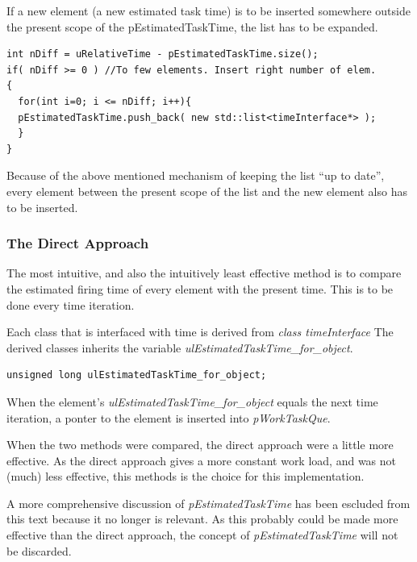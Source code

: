 
	If a new element (a new estimated task time) is to be inserted somewhere outside the present scope of the pEstimatedTaskTime, the list has to be expanded. %
\begin{lstlisting}
int nDiff = uRelativeTime - pEstimatedTaskTime.size();
if( nDiff >= 0 ) //To few elements. Insert right number of elem.
{
  for(int i=0; i <= nDiff; i++){
  pEstimatedTaskTime.push_back( new std::list<timeInterface*> );
  }
}
\end{lstlisting}
	Because of the above mentioned mechanism of keeping the list ``up to date'', every element between the present scope of the list and the new element also has to be inserted.

	

	\subsubsection{The Direct Approach}
	\label{ssChoiceOfTimeEstimationForThisImplementation}
	The most intuitive, and also the intuitively least effective method is to compare the estimated firing time of every element with the present time.
	This is to be done every time iteration.

	Each class that is interfaced with time is derived from \emph{class timeInterface}
	The derived classes inherits the variable \emph{ulEstimatedTaskTime\_for\_object}.
\begin{lstlisting}
unsigned long ulEstimatedTaskTime_for_object;
\end{lstlisting}
	When the element's \emph{ulEstimatedTaskTime\_for\_object} equals the next time iteration, a ponter to the element is inserted into \emph{pWorkTaskQue}.

	When the two methods were compared, the direct approach were a little more effective. 
	As the direct approach gives a more constant work load, and was not (much) less effective, this methods is the choice for this implementation.

	A more comprehensive discussion of \emph{pEstimatedTaskTime} has been escluded from this text because it no longer is relevant. 
	As this probably could be made more effective than the direct approach, the concept of \emph{pEstimatedTaskTime} will not be discarded.

